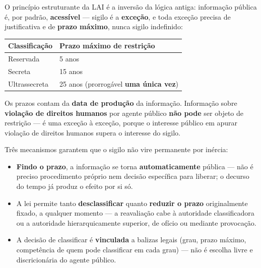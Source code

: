 \begin{conceito}
O princípio estruturante da LAI é a inversão da lógica antiga: informação
pública é, por padrão, \textbf{acessível} --- sigilo é a
\textbf{exceção}, e toda exceção precisa de justificativa e de
\textbf{prazo máximo}, nunca sigilo indefinido:

\begin{center}
\begin{tabular}{@{}p{4cm}p{6cm}@{}}
\toprule
\textbf{Classificação} & \textbf{Prazo máximo de restrição} \\
\midrule
Reservada & 5 anos \\
Secreta & 15 anos \\
Ultrassecreta & 25 anos (prorrogável \textbf{uma única vez}) \\
\bottomrule
\end{tabular}
\end{center}

Os prazos contam da \textbf{data de produção} da informação. Informação
sobre \textbf{violação de direitos humanos} por agente público \textbf{não
pode} ser objeto de restrição --- é uma exceção à exceção, porque o
interesse público em apurar violação de direitos humanos supera o
interesse do sigilo.
\end{conceito}

\begin{conceito}
Três mecanismos garantem que o sigilo não vire permanente por inércia:
\begin{itemize}
\item \textbf{Findo o prazo}, a informação se torna \textbf{automaticamente}
pública --- não é preciso procedimento próprio nem decisão específica para
liberar; o decurso do tempo já produz o efeito por si só.
\item A lei permite tanto \textbf{desclassificar} quanto \textbf{reduzir o
prazo} originalmente fixado, a qualquer momento --- a reavaliação cabe à
autoridade classificadora ou a autoridade hierarquicamente superior, de
ofício ou mediante provocação.
\item A decisão de classificar é \textbf{vinculada} a balizas legais
(grau, prazo máximo, competência de quem pode classificar em cada grau)
--- não é escolha livre e discricionária do agente público.
\end{itemize}
\end{conceito}

